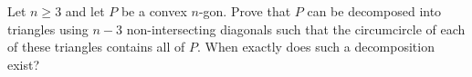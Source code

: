 Let $n \geq 3$ and let $P$ be a convex $n$-gon. Prove that $P$ can be decomposed into
triangles using $n-3$ non-intersecting diagonals such that the circumcircle of each of these
triangles contains all of $P$. When exactly does such a decomposition exist?